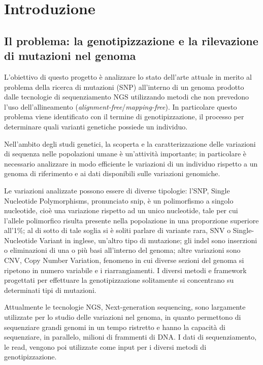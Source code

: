 \documentclass[../main.tex]{subfiles}
\begin{document}
\section{Introduzione}

\subsection{Il problema: la genotipizzazione e la rilevazione di mutazioni nel genoma}

L'obiettivo di questo progetto è analizzare lo stato dell'arte attuale in merito al problema della ricerca di mutazioni (SNP) all'interno di un genoma prodotto dalle tecnologie di sequenziamento NGS utilizzando metodi che non prevedono l'uso dell'allineamento (\textit{alignment-free}/\textit{mapping-free}). In particolare questo problema viene identificato con il termine di genotipizzazione, il processo per determinare quali varianti genetiche possiede un individuo.

Nell'ambito degli studi genetici, la scoperta e la caratterizzazione delle variazioni di sequenza nelle popolazioni umane è un'attività importante; in particolare è necessario analizzare in modo efficiente le variazioni di un individuo rispetto a un genoma di riferimento e ai dati disponibili sulle variazioni genomiche. 

Le variazioni analizzate possono essere di diverse tipologie: l'SNP, Single Nucleotide Polymorphisms, pronunciato snip, è un polimorfismo a singolo nucleotide, cioè una variazione rispetto ad un unico nucleotide, tale per cui l'allele polimorfico risulta presente nella popolazione in una proporzione superiore all'1\%; al di sotto di tale soglia si è soliti parlare di variante rara, SNV o Single-Nucleotide Variant in inglese, un'altro tipo di mutazione; gli indel sono inserzioni o eliminazioni di una o più basi all'interno del genoma; altre variazioni sono CNV, Copy Number Variation, fenomeno in cui diverse sezioni del genoma si ripetono in numero variabile e i riarrangiamenti. I diversi metodi e framework progettati per effettuare la genotipizzazione solitamente si concentrano su determinati tipi di mutazioni.


Attualmente le tecnologie NGS, Next-generation sequencing, sono largamente utilizzate per lo studio delle variazioni nel genoma, in quanto permettono di sequenziare grandi genomi in un tempo ristretto e hanno la capacità di sequenziare, in parallelo, milioni di frammenti di DNA. I dati di sequenziamento, le read, vengono poi utilizzate come input per i diversi metodi di genotipizzazione.
\end{document}
